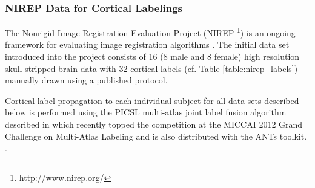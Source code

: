 %
%

\subsubsection{NIREP Data for Cortical Labelings}

The Nonrigid Image Registration Evaluation Project (NIREP%
\footnote{
http://www.nirep.org/
}) 
is an ongoing framework for evaluating image registration algorithms \citep{christensen2006}.
The initial data set introduced into the project consists of 
16 (8 male and 8 female) high resolution skull-stripped brain 
data with 32 cortical labels (cf. Table \ref{table:nirep_labels}) manually drawn using a 
published protocol.

Cortical label propagation to each individual subject for all data sets
described below is performed using the PICSL multi-atlas joint label fusion
algorithm described in \cite{wang2013} which recently topped the competition
at the MICCAI 2012 Grand Challenge on Multi-Atlas Labeling and is also 
distributed with the ANTs toolkit.  .


